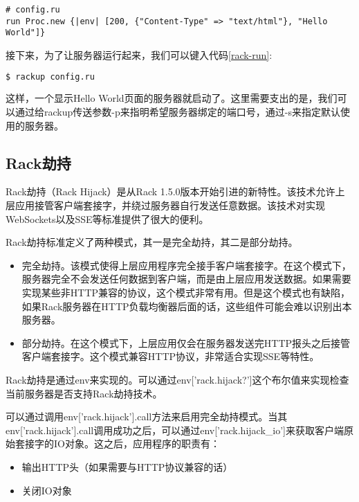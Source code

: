 \begin{lstlisting}[caption={Rack配置文件}, label=rack-config]
# config.ru
run Proc.new {|env| [200, {"Content-Type" => "text/html"}, "Hello World"]}
\end{lstlisting}

接下来，为了让服务器运行起来，我们可以键入代码\ref{rack-run}:

\begin{lstlisting}[caption={安装Rack}, label=rack-run, language=bash, numbers=none]
$ rackup config.ru
\end{lstlisting}

这样，一个显示Hello World页面的服务器就启动了。这里需要支出的是，我们可以通过给rackup传送参数-p来指明希望服务器绑定的端口号，通过-s来指定默认使用的服务器。

\subsection{Rack劫持}
Rack劫持（Rack Hijack）是从Rack 1.5.0版本开始引进的新特性。该技术允许上层应用接管客户端套接字，并绕过服务器自行发送任意数据。该技术对实现WebSockets以及SSE等标准提供了很大的便利。


Rack劫持标准定义了两种模式，其一是完全劫持，其二是部分劫持。

\begin{itemize}
\item 完全劫持。该模式使得上层应用程序完全接手客户端套接字。在这个模式下，服务器完全不会发送任何数据到客户端，而是由上层应用发送数据。如果需要实现某些非HTTP兼容的协议，这个模式非常有用。但是这个模式也有缺陷，如果Rack服务器在HTTP负载均衡器后面的话，这些组件可能会难以识别出本服务器。

\item 部分劫持。在这个模式下，上层应用仅会在服务器发送完HTTP报头之后接管客户端套接字。这个模式兼容HTTP协议，非常适合实现SSE等特性。
\end{itemize}

Rack劫持是通过env来实现的。可以通过env['rack.hijack?']这个布尔值来实现检查当前服务器是否支持Rack劫持技术。

可以通过调用env['rack.hijack'].call方法来启用完全劫持模式。当其env['rack.hijack'].call调用成功之后，可以通过env['rack.hijack\_io']来获取客户端原始套接字的IO对象。这之后，应用程序的职责有：

\begin{itemize}
\item 输出HTTP头（如果需要与HTTP协议兼容的话）
\item 关闭IO对象
\end{itemize}

